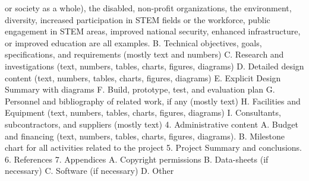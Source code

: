 \documentclass[a4paper,10pt]{article}
\begin{document}
or society as a whole), the disabled, non-profit organizations, the environment,
diversity, increased participation in STEM fields or the workforce, public
engagement in STEM areas, improved national security, enhanced infrastructure, or
improved education are all examples.
B. Technical objectives, goals, specifications, and requirements (mostly text
and numbers)
C. Research and investigations (text, numbers, tables, charts, figures,
diagrams)
D. Detailed design content (text, numbers, tables, charts, figures, diagrams)
E. Explicit Design Summary with diagrams
F. Build, prototype, test, and evaluation plan
G. Personnel and bibliography of related work, if any (mostly text)
H. Facilities and Equipment (text, numbers, tables, charts, figures, diagrams)
I. Consultants, subcontractors, and suppliers (mostly text)
4. Administrative content
A. Budget and financing (text, numbers, tables, charts, figures, diagrams).
B. Milestone chart for all activities related to the project
5. Project Summary and conclusions.
6. References
7. Appendices
A. Copyright permissions
B. Data-sheets (if necessary)
C. Software (if necessary)
D. Other
\end{document}
